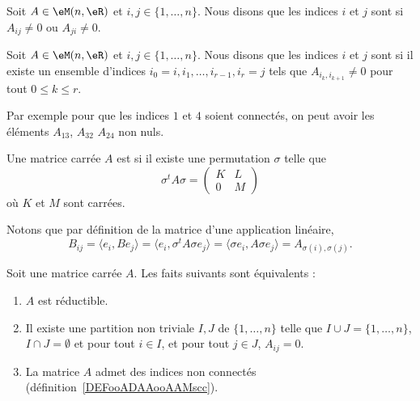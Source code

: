 \begin{definition}
	Soit \( A\in \eM(n,\eR)\) et \( i,j\in\{ 1,\ldots, n \}\). Nous disons que les indices \( i\) et \( j\) sont  si \( A_{ij}\neq 0\) ou \( A_{ji}\neq 0\).
\end{definition}

\begin{definition}      \label{DEFooADAAooAAMscc}
	Soit \( A\in \eM(n,\eR)\) et \( i,j\in\{ 1,\ldots, n \}\). Nous disons que les indices \( i\) et \( j\) sont  si il existe un ensemble d'indices \( i_0=i,i_1,\ldots, i_{r-1},i_r=j   \) tels que \( A_{i_k,i_{k+1}}\neq 0\) pour tout \( 0\leq k\leq r\).
\end{definition}

Par exemple pour que les indices \( 1\) et \( 4\) soient connectés, on peut avoir les éléments \( A_{13}\), \( A_{32}\) \( A_{24}\) non nuls.

\begin{definition}      \label{DEFooXIREooQtlzkO}
	Une matrice carrée \( A\) est  si il existe une permutation \( \sigma\) telle que
	\begin{equation}        \label{EQooGGZKooUyXSJk}
		\sigma^tA\sigma=\begin{pmatrix}
			K & L \\
			0 & M
		\end{pmatrix}
	\end{equation}
	où \( K\) et \( M\) sont carrées.
\end{definition}
Notons que par définition de la matrice d'une application linéaire,
\begin{equation}
	B_{ij}= \langle e_i, Be_j\rangle =\langle e_i, \sigma^tA\sigma e_j\rangle =\langle \sigma e_i, A\sigma e_j\rangle =A_{\sigma(i),\sigma(j)}.
\end{equation}

\begin{proposition}      \label{PROPooZTYDooZAxQxF}
	Soit une matrice carrée \( A\). Les faits suivants sont équivalents :
	\begin{enumerate}
		\item       \label{ITEMooYULAooVqgOnt}
		      \( A\) est réductible.
		\item       \label{ITEMooNLVXooYSQKwO}
		      Il existe une partition non triviale \( I,J\) de \( \{ 1,\ldots, n \}\) telle que \( I\cup J=\{ 1,\ldots, n \}\), \( I\cap J=\emptyset\) et pour tout \( i\in I\), et pour tout \( j\in J\), \( A_{ij}=0\).
		\item       \label{ITEMooVNOHooRUNpwG}
		      La matrice \( A\) admet des indices non connectés (définition~\ref{DEFooADAAooAAMscc}).
	\end{enumerate}
\end{proposition}

